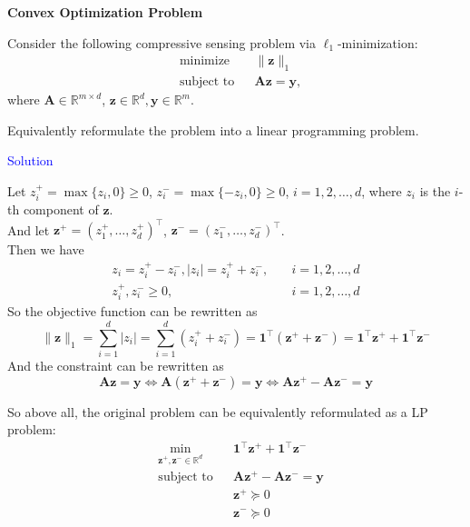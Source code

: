 \item[\uppercase\expandafter{\romannumeral1}.] \textbf{Convex Optimization Problem}

Consider the following compressive sensing problem via \(\ell_1\)-minimization:
\[
\begin{aligned}
& \text{minimize} && \|\pmb z\|_1 \\
& \text{subject to} && \pmb A \pmb z = \pmb y,
\end{aligned}
\]
where \(\pmb A \in \mathbb{R}^{m\times d}\), \(\pmb z \in \mathbb{R}^d , \pmb y \in \mathbb{R}^m\).

Equivalently reformulate the problem into a linear programming problem. 

\textcolor{blue}{Solution}

Let $z_i^+=\max\{z_i,0\}\geq 0$, $z_i^-=\max\{-z_i,0\}\geq 0$, $i=1,2,\ldots,d$, where $z_i$ is the $i$-th component of $\pmb z$. \\
And let $\pmb z^+=\left(z_1^+,\ldots, z_d^+\right)^{\top}$, $\pmb z^-=\left(z_1^-,\ldots, z_d^-\right)^{\top}$. \\
Then we have
\begin{align*}
z_i = z_i^+ - z_i^- , |z_i| = z_i^+ + z_i^- ,&\quad i=1,2,\ldots,d \\
z_i^+, z_i^-\geq 0 ,&\quad i=1,2,\ldots,d
\end{align*}
So the objective function can be rewritten as
$$\|\pmb z\|_1 = \sum_{i=1}^d |z_i| = \sum_{i=1}^d\left(z_i^+ + z_i^-\right) = \pmb 1^{\top}\left(\pmb z^+ + \pmb z^-\right) = \pmb 1^{\top}\pmb z^+ + \pmb 1^{\top}\pmb z^-$$
And the constraint can be rewritten as
$$\pmb A\pmb z = \pmb y \Leftrightarrow \pmb A\left(\pmb z^+ + \pmb z^-\right)= \pmb y\Leftrightarrow \pmb A\pmb z^+ - \pmb A\pmb z^- = \pmb y$$

So above all, the original problem can be equivalently reformulated as a LP problem:
\[\begin{aligned}
& \min\limits_{\pmb z^+,\pmb z^-\in\mathbb{R}^d} && \pmb 1^{\top}\pmb z^+ + \pmb 1^{\top}\pmb z^- \\
& \text{subject to} && \pmb A\pmb z^+ - \pmb A\pmb z^- = \pmb y \\
& && \pmb z^+ \succeq 0 \\
& && \pmb z^- \succeq 0
\end{aligned}\]

\newpage
